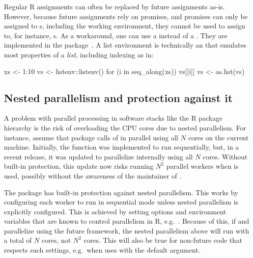 Regular R assignments can often be replaced by future assignments
as-is.  However, because future assignments rely on promises, and
promises can only be assigned to s, including the
working environment, they cannot be used to assign to, for
instance, s.  As a workaround, one can use a  instead of a .  They are implemented in
the  package~\citep{CRAN:listenv}.  A list
environment is technically an  that emulates most 
properties of a \emph{list}, including indexing as in:
\begin{example}
xs <- 1:10
vs <- listenv::listenv()
for (i in seq_along(xs)) {
  vs[[i]] %
}
vs <- as.list(vs)
\end{example}


\subsection{Nested parallelism and protection against it}
\label{protection-against-nested-parallelism}

A problem with parallel processing in software stacks like the R
package hierarchy is the risk of overloading the CPU cores due to
nested parallelism. For instance, assume that package  calls
 of  in parallel using all $N$ cores on the
current machine. Initially, the  function was
implemented to run sequentially, but, in a recent release, it was
updated to parallelize internally using all $N$ cores.  Without
built-in protection, this update now risks running $N^2$ parallel
workers when  is used, possibly without the awareness of the
maintainer of .

The  package has built-in protection against nested
parallelism. This works by configuring each worker to run in
sequential mode unless nested parallelism is explicitly configured.
This is achieved by setting options and environment variables that are
known to control parallelism in R,
e.g.\ .  Because of this, if 
and  parallelize using the future framework, the nested
parallelism above will run with a total of $N$ cores, not $N^2$ cores.
This will also be true for non-future code that respects such
settings, e.g.\ when  uses  with
the default
 argument.

